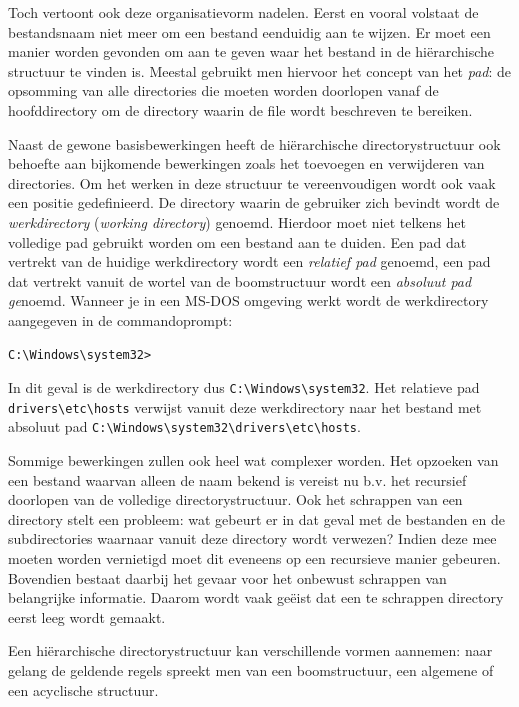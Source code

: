 Toch vertoont ook deze organisatievorm nadelen. Eerst en vooral
volstaat de bestandsnaam niet meer om een bestand eenduidig aan te
wijzen. Er moet een manier worden gevonden om aan te geven waar het
bestand in de hi\"erarchische structuur te vinden is. Meestal gebruikt
men hiervoor het concept van het \emph{pad}: de
opsomming van alle directories die moeten worden doorlopen vanaf de
hoofddirectory om de directory waarin de file wordt beschreven te
bereiken.

Naast de gewone basisbewerkingen heeft de hi\"erarchische
directorystructuur ook behoefte aan bijkomende bewerkingen zoals het
toevoegen en verwijderen van directories. Om het werken in deze
structuur te vereenvoudigen wordt ook vaak een positie gedefinieerd.
De directory waarin de gebruiker zich bevindt wordt de
\emph{werkdirectory} (\emph{working
directory}) genoemd. Hierdoor moet niet telkens het
volledige pad gebruikt worden om een bestand aan te duiden. Een pad
dat vertrekt van de huidige werkdirectory wordt een
\emph{relatief pad} genoemd, een pad dat vertrekt
vanuit de wortel van de boomstructuur wordt een \emph{absoluut
pad ge}noemd. Wanneer je in een MS-DOS omgeving werkt wordt
de werkdirectory aangegeven in de commandoprompt:

\begin{verbatim}
C:\Windows\system32>
\end{verbatim}

In dit geval is de werkdirectory dus \verb|C:\Windows\system32|. Het
relatieve pad \verb|drivers\etc\hosts| verwijst vanuit deze werkdirectory
naar het bestand met absoluut pad \verb|C:\Windows\system32\drivers\etc\hosts|.

Sommige bewerkingen zullen ook heel wat complexer worden. Het
opzoeken van een bestand waarvan alleen de naam bekend is vereist nu
b.v. het recursief doorlopen van de volledige directorystructuur. Ook
het schrappen van een directory stelt een probleem: wat gebeurt er in
dat geval met de bestanden en de subdirectories waarnaar vanuit deze
directory wordt verwezen? Indien deze mee moeten worden vernietigd
moet dit eveneens op een recursieve manier gebeuren. Bovendien bestaat
daarbij het gevaar voor het onbewust schrappen van belangrijke
informatie. Daarom wordt vaak ge\"eist dat een te schrappen directory
eerst leeg wordt gemaakt.

Een hi\"erarchische directorystructuur kan verschillende vormen
aannemen: naar gelang de geldende regels spreekt men van een
boomstructuur, een algemene of een acyclische structuur.

